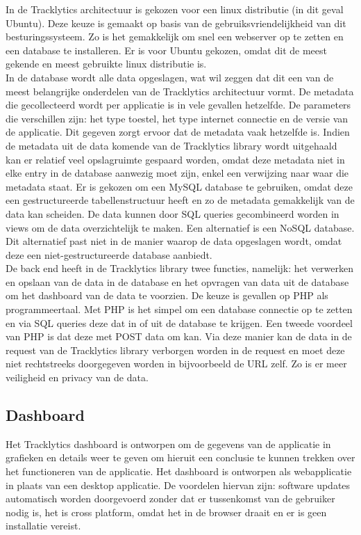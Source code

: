 In de Tracklytics architectuur is gekozen voor een linux distributie (in dit geval Ubuntu). Deze keuze is gemaakt op basis van de gebruiksvriendelijkheid van dit besturingssysteem. Zo is het gemakkelijk om snel een webserver op te zetten en een database te installeren. Er is voor Ubuntu gekozen, omdat dit de meest gekende en meest gebruikte linux distributie is. \\

In de database wordt alle data opgeslagen, wat wil zeggen dat dit een van de meest belangrijke onderdelen van de Tracklytics architectuur vormt. De metadata die gecollecteerd wordt per applicatie is in vele gevallen hetzelfde. De parameters die verschillen zijn: het type toestel, het type internet connectie en de versie van de applicatie. Dit gegeven zorgt ervoor dat de metadata vaak hetzelfde is. Indien de metadata uit de data komende van de Tracklytics library wordt uitgehaald kan er relatief veel opslagruimte gespaard worden, omdat deze metadata niet in elke entry in de database aanwezig moet zijn, enkel een verwijzing naar waar die metadata staat. Er is gekozen om een MySQL database te gebruiken, omdat deze een gestructureerde tabellenstructuur heeft en zo de metadata gemakkelijk van de data kan scheiden. De data kunnen door SQL queries gecombineerd worden in views om de data overzichtelijk te maken. Een alternatief is een NoSQL database. Dit alternatief past niet in de manier waarop de data opgeslagen wordt, omdat deze een niet-gestructureerde database aanbiedt. \\

De back end heeft in de Tracklytics library twee functies, namelijk: het verwerken en opslaan van de data in de database en het opvragen van data uit de database om het dashboard van de data te voorzien. De keuze is gevallen op PHP als programmeertaal. Met PHP is het simpel om een database connectie op te zetten en via SQL queries deze dat in of uit de database te krijgen. Een tweede voordeel van PHP is dat deze met POST data om kan. Via deze manier kan de data in de request van de Tracklytics library verborgen worden in de request en moet deze niet rechtstreeks doorgegeven worden in bijvoorbeeld de URL zelf. Zo is er meer veiligheid en privacy van de data. \\


\subsection{Dashboard}
Het Tracklytics dashboard is ontworpen om de gegevens van de applicatie in grafieken en details weer te geven om hieruit een conclusie te kunnen trekken over het functioneren van de applicatie. Het dashboard is ontworpen als webapplicatie in plaats van een desktop applicatie. De voordelen hiervan zijn: software updates automatisch worden doorgevoerd zonder dat er tussenkomst van de gebruiker nodig is, het is cross platform, omdat het in de browser draait en er is geen installatie vereist. \\

